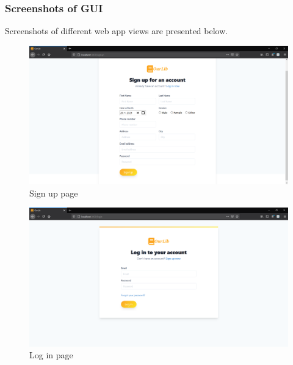 \subsubsection{Screenshots of GUI}
Screenshots of different web app views are presented below. 



\begin{figure}[H]
    \centering
    \includegraphics[width=\textwidth]{Include/Resources/FrontendScreens/React/signup.png}
    \caption{Sign up page}
    \label{fig:ScreenshotGUIsignup}
\end{figure}




\begin{figure}[H]
    \centering
    \includegraphics[width=\textwidth]{Include/Resources/FrontendScreens/React/login.png}
    \caption{Log in page}
    \label{fig:ScreenshotGUIlogin}
\end{figure}




